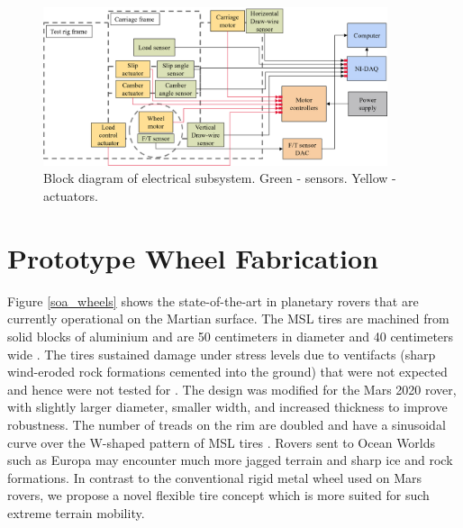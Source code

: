 \documentclass{article}
\begin{document}


\begin{figure}[hbt!]
\centering
\includegraphics[width=0.9\textwidth]{plots/electrical_components_diagram.PNG}
\caption{Block diagram of electrical subsystem. Green - sensors. Yellow - actuators.}
\label{fig:electrical-diagram}
\end{figure}




\section{Prototype Wheel Fabrication}
\label{sec:tire-prototyoe-fabrication}
 Figure \ref{soa_wheels} shows the state-of-the-art in planetary rovers that are currently operational on the Martian surface. The MSL tires are machined from solid blocks of aluminium and are 50 centimeters in diameter and 40 centimeters wide \cite{haggart2008mobility}. The tires sustained damage under stress levels due to ventifacts (sharp wind-eroded rock formations cemented into the ground) that were not expected and hence were not tested for \cite{toupet2018traction}. The design was modified for the Mars 2020 rover, with slightly larger diameter, smaller width, and increased thickness to improve robustness. The number of treads on the rim are doubled and have a sinusoidal curve over the W-shaped pattern of MSL tires \cite{inotsume2019parametric}. Rovers sent to Ocean Worlds such as Europa may encounter much more jagged terrain and sharp ice and rock formations. In contrast to the conventional rigid metal wheel used on Mars rovers, we propose a novel flexible tire concept which is more suited for such extreme terrain mobility.
\end{document}
